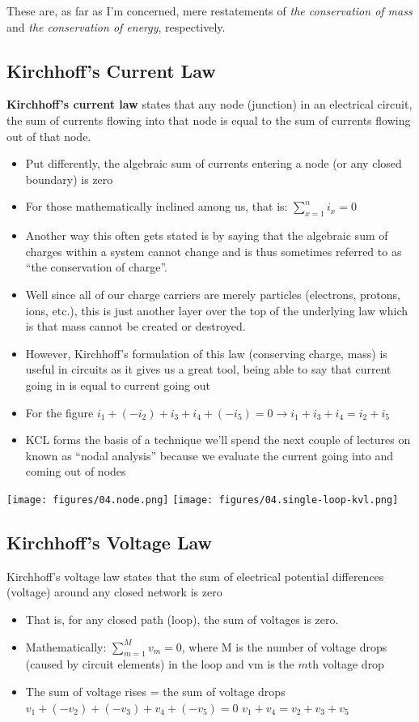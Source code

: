 \documentclass[11pt]{book}
\begin{document}
These are, as far as I’m concerned, mere restatements of \textit{the conservation of mass} and \textit{the conservation of energy}, respectively.


\subsection{Kirchhoff's Current Law}
\textbf{Kirchhoff's current law} states that any node (junction) in an electrical circuit, the sum of currents flowing into that node is equal to the sum of currents flowing out of that node.

\begin{itemize}
	\item Put differently, the algebraic sum of currents entering a node (or any closed boundary) is zero
	\item For those mathematically inclined among us, that is: $\sum_{x=1}^n i_x = 0$
	\item Another way this often gets stated is by saying that the algebraic sum of charges within a system cannot change and is thus sometimes referred to as ``the conservation of charge''.
	\item Well since all of our charge carriers are merely particles (electrons, protons, ions, etc.), this is just another layer over the top of the underlying law which is that mass cannot be created or destroyed.
	\item However, Kirchhoff's formulation of this law (conserving charge, mass) is useful in circuits as it gives us a great tool, being able to say that current going in is equal to current going out
	\item For the figure $i_1 + (-i_2) + i_3 + i_4 + (-i_5) = 0 \rightarrow i_1 +i_3 + i_4 = i_2 + i_5$
	\item KCL forms the basis of a technique we’ll spend the next couple of lectures on known as “nodal analysis” because we evaluate the current going into and coming out of nodes
\end{itemize}

\texttt{[image: figures/04.node.png]}
\texttt{[image: figures/04.single-loop-kvl.png]}

\subsection{Kirchhoff's Voltage Law}
Kirchhoff's voltage law states that the sum of electrical potential differences (voltage) around any closed network is zero
\begin{itemize}
	\item That is, for any closed path (loop), the sum of voltages is zero.
	\item Mathematically: $\sum_{m=1}^{M} v_m = 0$, where M is the number of voltage drops (caused by circuit elements) in the loop and vm is the $m$th voltage drop
	\item The sum of voltage rises = the sum of voltage drops
	\subitem $v_1 + (-v_2) + (-v_3) + v_4 + (-v_5) = 0$
	\subitem $v_1 + v_4 = v_2 +v_3 + v_5$
	
\end{itemize}
\end{document}
